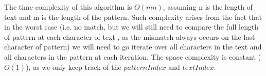 \documentclass{l4proj}
\begin{document}






The time complexity of this algorithm is $O(mn)$, assuming n is the length of text and m is the length of the pattern. Such complexity arises from the fact that in the worst case (i.e. no match, but we will still need to compare the full length of pattern at each character of text , as the mismatch always occurs on the last character of pattern) we will need to go iterate over all characters in the text and all characters in the pattern at each iteration. The space complexity is constant ($O(1)$), as we only keep track of the $patternIndex$ and $textIndex$.
\end{document}
